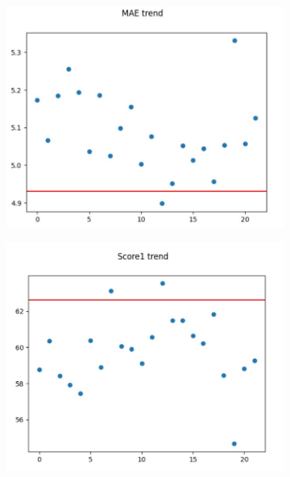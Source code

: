 \documentclass[
	letterpaper,
	a4paper,
	cleardoublepage=empty,
	headings=twolinechapter,
	numbers=autoenddot,
]{article}
\begin{document}
	\begin{figure}[h]
		\centering
		\begin{subfigure}{.5\textwidth}
			\centering
			\includegraphics[width=0.7\linewidth]{ImageFiles/nll_bnn_mae}
			\caption{}
			\label{fig:nll__bnn_mae}
		\end{subfigure}%
		\begin{subfigure}{.5\textwidth}
			\centering
			\includegraphics[width=0.7\linewidth]{ImageFiles/nll_bnn_eff1}
			\caption{}
			\label{fig:nll_bnn_eff1}
		\end{subfigure}
	

\end{figure}
\end{document}

